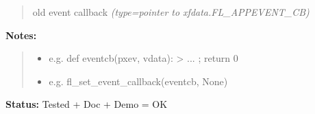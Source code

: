 \begin{boxedminipage}{\funcwidth}
\begin{quote}
old event callback
      {\it (type=pointer to xfdata.FL\_APPEVENT\_CB)}

      \end{quote}

\textbf{Notes:}
\begin{quote}
  \begin{itemize}

  \item
    \setlength{\parskip}{0.6ex}

e.g. def eventcb(pxev, vdata): > ... ; return 0


  \item 
e.g. fl\_set\_event\_callback(eventcb, None)


\end{itemize}

\end{quote}

\textbf{Status:} 
Tested + Doc + Demo = OK


    \end{boxedminipage}

    \label{xformslib:flxbasic:fl_set_idle_callback}

    \vspace{0.5ex}

